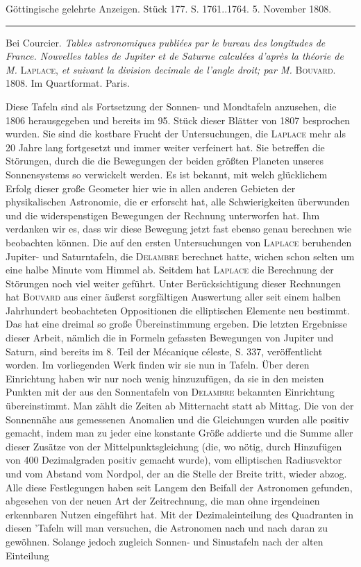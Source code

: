 \clearpage
{}
\begin{center}\small Göttingische gelehrte Anzeigen. Stück 177. S. 1761..1764. 5. November 1808.\\[3pt]\rule{.72\linewidth}{.3pt}\end{center}

Bei Courcier. \emph{Tables astronomiques publiées par le bureau des longitudes de France. Nouvelles tables de Jupiter et de Saturne calculées d'après la théorie de M. }\textsc{Laplace}, \emph{et suivant la division decimale de l'angle droit; par M.} \textsc{Bouvard}. 1808. Im Quartformat. Paris.

Diese Tafeln sind als Fortsetzung der Sonnen- und Mondtafeln anzusehen, die 1806 herausgegeben und bereits im 95. Stück dieser Blätter von 1807 besprochen wurden. Sie sind die kostbare Frucht der Untersuchungen, die \textsc{Laplace} mehr als 20 Jahre lang fortgesetzt und immer weiter verfeinert hat. Sie betreffen die Störungen, durch die die Bewegungen der beiden größten Planeten unseres Sonnensystems so verwickelt werden. Es ist bekannt, mit welch glücklichem Erfolg dieser große Geometer hier wie in allen anderen Gebieten der physikalischen Astronomie, die er erforscht hat, alle Schwierigkeiten überwunden und die widerspenstigen Bewegungen der Rechnung unterworfen hat. Ihm verdanken wir es, dass wir diese Bewegung jetzt fast ebenso genau berechnen wie beobachten können. Die auf den ersten Untersuchungen von \textsc{Laplace} beruhenden Jupiter- und Saturntafeln, die \textsc{Delambre} berechnet hatte, wichen schon selten um eine halbe Minute vom Himmel ab. Seitdem hat \textsc{Laplace} die Berechnung der Störungen noch viel weiter geführt. Unter Berücksichtigung dieser Rechnungen hat \textsc{Bouvard} aus einer äußerst sorgfältigen Auswertung aller seit einem halben Jahrhundert beobachteten Oppositionen die elliptischen Elemente neu bestimmt. Das hat eine dreimal so große Übereinstimmung ergeben. Die letzten Ergebnisse dieser Arbeit, nämlich die in Formeln gefassten Bewegungen von Jupiter und Saturn, sind bereits im 8. Teil der Mécanique céleste, S. 337, veröffentlicht worden. Im vorliegenden Werk finden wir sie nun in Tafeln. Über deren Einrichtung haben wir nur noch wenig hinzuzufügen, da sie in den meisten Punkten mit der aus den Sonnentafeln von \textsc{Delambre} bekannten Einrichtung übereinstimmt. Man zählt die Zeiten ab Mitternacht statt ab Mittag. Die von der Sonnennähe aus gemessenen Anomalien und die Gleichungen wurden alle positiv gemacht, indem man zu jeder eine konstante Größe addierte und die Summe aller dieser Zusätze von der Mittelpunktsgleichung (die, wo nötig, durch Hinzufügen von 400 Dezimalgraden positiv gemacht wurde), vom elliptischen Radiusvektor und vom Abstand vom Nordpol, der an die Stelle der Breite tritt, wieder abzog. Alle diese Festlegungen haben seit Langem den Beifall der Astronomen gefunden, abgesehen von der neuen Art der Zeitrechnung, die man ohne irgendeinen erkennbaren Nutzen eingeführt hat. Mit der Dezimaleinteilung des Quadranten in diesen 'Tafeln will man versuchen, die Astronomen nach und nach daran zu gewöhnen. Solange jedoch zugleich Sonnen- und Sinustafeln nach der alten Einteilung 
